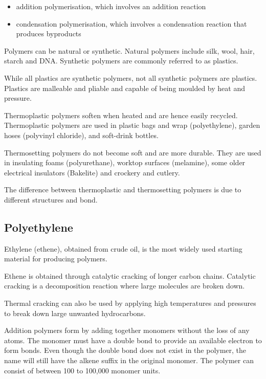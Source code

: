 		\begin{itemize}
			\item addition polymerisation, which involves an addition reaction
			\item condensation polymerisation, which involves a condensation reaction that produces byproducts
		\end{itemize}

	Polymers can be natural or synthetic. Natural polymers include silk, wool, hair, starch and DNA. Synthetic polymers are commonly referred to as plastics.

	While all plastics are synthetic polymers, not all synthetic polymers are plastics. Plastics are malleable and pliable and capable of being moulded by heat and pressure.

	Thermoplastic polymers soften when heated and are hence easily recycled. Thermoplastic polymers are used in plastic bags and wrap (polyethylene), garden hoses (polyvinyl chloride), and soft-drink bottles.

	Thermosetting polymers do not become soft and are more durable. They are used in insulating foams (polyurethane), worktop surfaces (melamine), some older electrical insulators (Bakelite) and crockery and cutlery.

	The difference between thermoplastic and thermosetting polymers is due to different structures and bond.

	\subsection{Polyethylene}
		
		Ethylene (ethene), obtained from crude oil, is the most widely used starting material for producing polymers.

		\begin{center}
		\end{center}

		Ethene is obtained through catalytic cracking of longer carbon chains. Catalytic cracking is a decomposition reaction where large molecules are broken down.

		Thermal cracking can also be used by applying high temperatures and pressures to break down large unwanted hydrocarbons.

		Addition polymers form by adding together monomers without the loss of any atoms. The monomer must have a double bond to provide an available electron to form bonds. Even though the double bond does not exist in the polymer, the name will still have the alkene suffix in the original monomer. The polymer can consist of between 100 to 100,000 monomer units.

